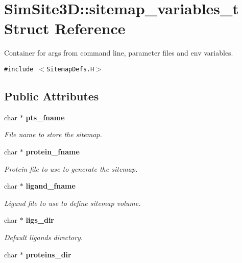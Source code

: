 \section{SimSite3D::sitemap\_\-variables\_\-t Struct Reference}
\label{structSimSite3D_1_1sitemap__variables__t}
Container for args from command line, parameter files and env variables.  


{\tt \#include $<$Sitemap\-Defs.H$>$}

\subsection*{Public Attributes}
\begin{CompactItemize}
\item 
char $\ast$ \bf{pts\_\-fname}\label{structSimSite3D_1_1sitemap__variables__t_85023c58ca8199341e073b66de1309ff}

\begin{CompactList}\small\item\em File name to store the sitemap. \item\end{CompactList}\item 
char $\ast$ \bf{protein\_\-fname}\label{structSimSite3D_1_1sitemap__variables__t_08d611868163121dfa6083f2265f2b9a}

\begin{CompactList}\small\item\em Protein file to use to generate the sitemap. \item\end{CompactList}\item 
char $\ast$ \bf{ligand\_\-fname}\label{structSimSite3D_1_1sitemap__variables__t_b192da1b9c611409dda2762f266f2f8d}

\begin{CompactList}\small\item\em Ligand file to use to define sitemap volume. \item\end{CompactList}\item 
char $\ast$ \bf{ligs\_\-dir}\label{structSimSite3D_1_1sitemap__variables__t_9209d76febae9ba180b5da6ad237e402}

\begin{CompactList}\small\item\em Default ligands directory. \item\end{CompactList}\item 
char $\ast$ \bf{proteins\_\-dir}\label{structSimSite3D_1_1sitemap__variables__t_079ccca327e81108ffa7b5ebda75b72b}


\end{CompactItemize}
